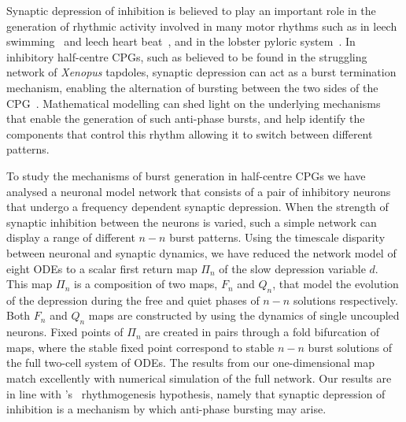 \documentclass[../manuscript.tex]{subfiles}
\begin{document}
    

Synaptic depression of inhibition is believed to play an important role in the generation of rhythmic activity involved in many motor rhythms such as in leech swimming~\citep{mangan1994} and leech heart beat~\citep{calabrese1995}, and in the lobster pyloric system~\citep{manor1997, rabbah2007}.
In inhibitory half-centre CPGs, such as believed to be found in the struggling network of \textit{Xenopus} tapdoles,  synaptic depression can act as a burst termination mechanism, enabling the alternation of bursting between the two sides of the CPG~\citep{li2007}.
Mathematical modelling can shed light on the underlying mechanisms that enable the generation of such anti-phase bursts, and help identify the components that control this rhythm allowing it to switch between different patterns.

To study the mechanisms of burst generation in half-centre CPGs we have analysed a neuronal model network that consists of a pair of inhibitory neurons that undergo a frequency dependent synaptic depression.
When the strength of synaptic inhibition between the neurons is varied, such a simple network can display a range of different $n-n$ burst patterns.
Using the timescale disparity between neuronal and synaptic dynamics, we have reduced the network model of eight ODEs to a scalar first return map $\Pi_n$ of the slow depression variable $d$.
This map $\Pi_n$ is a composition of two maps, $F_n$ and $Q_n$, that model the evolution of the depression during the free and quiet phases of $n-n$ solutions respectively.
Both $F_n$ and $Q_n$ maps are constructed by using the dynamics of single uncoupled neurons.
Fixed points of $\Pi_n$ are created in pairs through a fold bifurcation of maps, where the stable fixed point correspond to stable $n-n$ burst solutions of the full two-cell system of ODEs.
The results from our one-dimensional map match excellently with numerical simulation of the full network.
Our results are in line with \citeauthor{brown1911}'s~\citeyear{brown1911} rhythmogenesis hypothesis, namely that synaptic depression of inhibition is a mechanism by which anti-phase bursting may arise.
\end{document}
